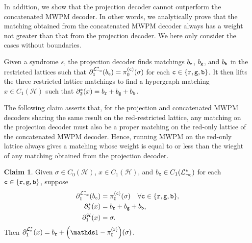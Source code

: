 \documentclass[a4paper,twocolumn,11pt,accepted=2025-01-21]{quantumarticle}
\theoremstyle{definition}
\theoremstyle{definition}
\theoremstyle{definition}
\newtheorem{claim}{Claim}
\begin{document}
In addition, we show that the projection decoder cannot outperform the concatenated MWPM decoder.
In other words, we analytically prove that the matching obtained from the concatenated MWPM decoder always has a weight not greater than that from the projection decoder.
We here only consider the cases without boundaries.

Given a syndrome $s$, the projection decoder finds matchings $b_{\texttt{r}}$, $b_{\texttt{g}}$, and $b_{\texttt{b}}$ in the restricted lattices such that $\partial_1^{\mathcal{L}^*_{\neg \texttt{c}}} (b_{\texttt{c}}) = \pi^{(\texttt{c})}_0(\sigma)$ for each $\texttt{c} \in \qty{\texttt{r}, \texttt{g}, \texttt{b}}$. 
It then lifts the three restricted lattice matchings to find a hypergraph matching $x \in C_1(\mathcal{H})$ such that $\partial_2^*(x) = b_{\texttt{r}} + b_{\texttt{g}} + b_{\texttt{b}}$. 

The following claim asserts that, for the projection and concatenated MWPM decoders sharing the same result on the red-restricted lattice, any matching on the projection decoder must also be a proper matching on the red-only lattice of the concatenated MWPM decoder. 
Hence, running MWPM on the red-only lattice always gives a matching whose weight is equal to or less than the wieght of any matching obtained from the projection decoder.

\begin{claim}
    Given $\sigma \in C_0(\mathcal{H})$, $x \in C_1(\mathcal{H})$, and $b_{\texttt{c}} \in C_1(\mathcal{L}_{\neg \texttt{c}}^*)$ for each $\texttt{c} \in \qty{\texttt{r}, \texttt{g}, \texttt{b}}$, suppose
    \begin{align*}
        \partial_1^{\mathcal{L}_{\neg \texttt{c}}^*} \qty(b_{\texttt{c}}) &= \pi_0^{(\texttt{c})}(\sigma)\quad \forall \texttt{c} \in \qty{\texttt{r}, \texttt{g}, \texttt{b}}, \\
        \partial_2^* (x) &= b_{\texttt{r}} + b_{\texttt{g}} + b_{\texttt{b}}, \\
        \partial_1^\mathcal{H} (x) &= \sigma.
    \end{align*}
    Then $\partial_1^{\LatticeMono{\rbs}}(x) = b_\rbs + \qty(\identity - \pi_0^{(\rbs)}) (\sigma)$.
\end{claim}
\end{document}
